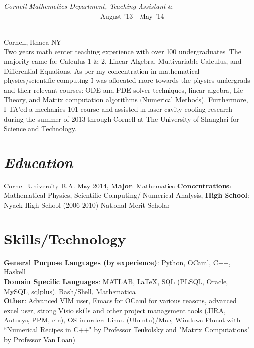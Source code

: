 \documentclass{res}
\begin{document}
{\begin{resume}
\begin{ncolumn}{2}
{\it Cornell Mathematics Department, Teaching Assistant} & ~~~~~~~~~~~~~~~~~~~
~~~~~~~~~~~~~~~~~~~~~~~~~~~~August '13 - May '14
\end{ncolumn}\\
Cornell, Ithaca NY\\
Two years math center teaching experience with over 100 undergraduates. The majority came for Calculus 1 \& 2, Linear Algebra, Multivariable Calculus, and Differential Equations. As per my concentration in mathematical physics/scientific computing I was allocated more towards the physics undergrads and their relevant courses: ODE and PDE solver techniques, linear algebra, Lie Theory, and Matrix computation algorithms (Numerical Methods). Furthermore, I TA'ed a mechanics 101 course and assisted in laser cavity cooling research during the summer of 2013 through Cornell at The University of Shanghai for Science and Technology.

\section{\sl\bf  Education}
Cornell University B.A. May 2014,
\textbf{Major}: Mathematics \textbf{Concentrations}: Mathematical
Physics, Scientific Computing/ Numerical Analysis, \textbf{High School}: Nyack High School (2006-2010) National Merit Scholar

\section{\textbf{Skills/Technology}}
{\bf General Purpose Languages (by experience)}: Python, OCaml, C++, Haskell\\
{\bf Domain Specific Languages}: MATLAB, LaTeX, SQL (PLSQL, Oracle, MySQL,
sqlplus), Bash/Shell, Mathematica\\
{\bf Other}: Advanced VIM user, Emacs for OCaml for various reasons, advanced
excel user, strong Visio skills and other project management tools (JIRA,
Autosys, PPM, etc), OS in order: Linux (Ubuntu)/Mac, Windows
Fluent with ``Numerical Recipes in C++" by Professor Teukolsky and "Matrix Computations" by Professor Van Loan)


\end{resume}}
\end{document}
